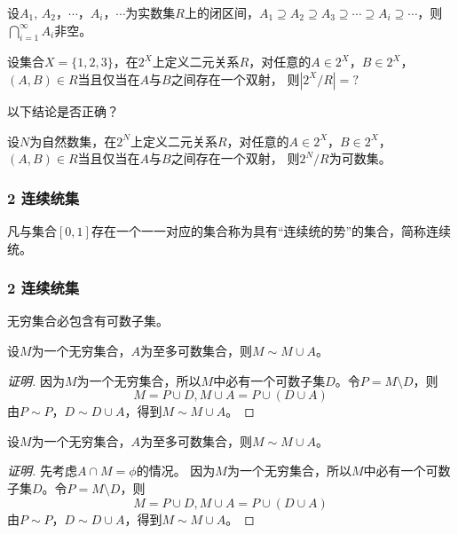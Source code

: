 \documentclass{beamer}
\begin{document}
\begin{CJK*}{UTF8}{gbsn}
\begin{frame}[t]
  设$A_1$, $A_2$，$\cdots$，$A_i$，$\cdots$为实数集$R$上的闭区间，$A_1\supseteq A_2 \supseteq A_3 \supseteq \cdots \supseteq A_i \supseteq \cdots$，则$\bigcap_{i=1}^{\infty}A_i$非空。
\end{frame}

\begin{frame}[t] \justifying\let\raggedright\justifying
   设集合$X=\{1,2,3\}$，在$2^X$上定义二元关系$R$，对任意的$A\in 2^X$，$B\in 2^X$，$(A,B)\in R$当且仅当在$A$与$B$之间存在一个双射，
   则$|2^X/R|=?$
\end{frame}
\begin{frame}[t] \justifying\let\raggedright\justifying
  以下结论是否正确？

  设$N$为自然数集，在$2^N$上定义二元关系$R$，对任意的$A\in 2^X$，$B\in 2^X$，$(A,B)\in R$当且仅当在$A$与$B$之间存在一个双射，
  则$2^N/R$为可数集。
\end{frame}
\begin{frame}[t]
  \frametitle{2 连续统集}
  \begin{Def}
    凡与集合$[0,1]$存在一个一一对应的集合称为具有“连续统的势”的集合，简称\alert{连续统}。
  \end{Def}
\end{frame}

\begin{frame}[t]
  \frametitle{2 连续统集}
  \begin{Thm}
    无穷集合必包含有可数子集。
  \end{Thm}
\end{frame}
\begin{frame}[t]
  \begin{Thm}
    设$M$为一个无穷集合，$A$为至多可数集合，则$M \sim M \cup A$。
  \end{Thm}\pause
  \begin{proof}[证明]
    因为$M$为一个无穷集合，所以$M$中必有一个可数子集$D$。令$P=M\setminus D$，则
    \[M=P\cup D, M\cup A = P\cup (D\cup A)\]
    由$P\sim P$，$D\sim D\cup A$，得到$M\sim M\cup A$。
  \end{proof}
\end{frame}
\begin{frame}[t]
  \begin{Thm}
    设$M$为一个无穷集合，$A$为至多可数集合，则$M \sim M \cup A$。
  \end{Thm}
  \begin{proof}[证明]
    先考虑$A\cap M=\phi$的情况。
    因为$M$为一个无穷集合，所以$M$中必有一个可数子集$D$。令$P=M\setminus D$，则
    \[M=P\cup D, M\cup A = P\cup (D\cup A)\]
    由$P\sim P$，$D\sim D\cup A$，得到$M\sim M\cup A$。


\end{proof}
\end{frame}
\end{CJK*}
\end{document}
